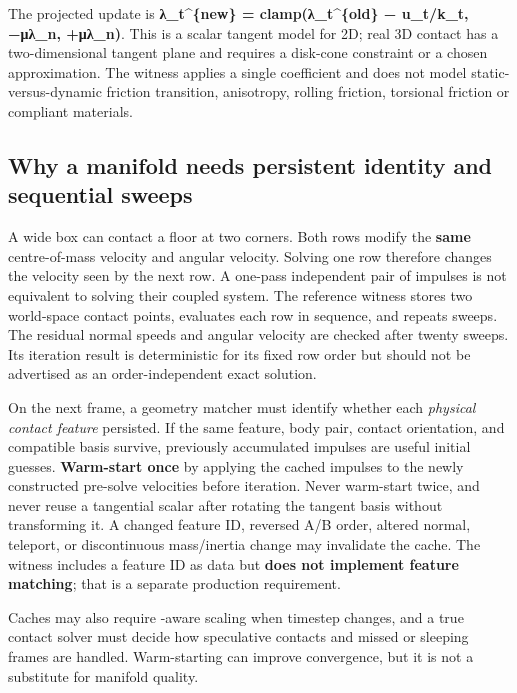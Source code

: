 The projected update is \textbf{λ\_t\^{}\{new\} = clamp(λ\_t\^{}\{old\} − u\_t/k\_t, −μλ\_n, +μλ\_n)}. This is a scalar tangent model for 2D; real 3D contact has a two-dimensional tangent plane and requires a disk-cone constraint or a chosen approximation. The witness applies a single coefficient and does not model static-versus-dynamic friction transition, anisotropy, rolling friction, torsional friction or compliant materials.

\subsection{Why a manifold needs persistent identity and sequential sweeps}\label{appendix-c9d92e145503-why-a-manifold-needs-persistent-identity-and-sequential-sweeps}

\hypertarget{appendix-c9d92e145503-why-a-manifold-needs-persistent-identity-and-sequential-sweeps}{}

A wide box can contact a floor at two corners. Both rows modify the \textbf{same} centre-of-mass velocity and angular velocity. Solving one row therefore changes the velocity seen by the next row. A one-pass independent pair of impulses is not equivalent to solving their coupled system. The reference witness stores two world-space contact points, evaluates each row in sequence, and repeats sweeps. The residual normal speeds and angular velocity are checked after twenty sweeps. Its iteration result is deterministic for its fixed row order but should not be advertised as an order-independent exact solution.

On the next frame, a geometry matcher must identify whether each \emph{physical contact feature} persisted. If the same feature, body pair, contact orientation, and compatible basis survive, previously accumulated impulses are useful initial guesses. \textbf{Warm-start once} by applying the cached impulses to the newly constructed pre-solve velocities before iteration. Never warm-start twice, and never reuse a tangential scalar after rotating the tangent basis without transforming it. A changed feature ID, reversed A/B order, altered normal, teleport, or discontinuous mass/inertia change may invalidate the cache. The witness includes a feature ID as data but \textbf{does not implement feature matching}; that is a separate production requirement.

Caches may also require -aware scaling when timestep changes, and a true contact solver must decide how speculative contacts and missed or sleeping frames are handled. Warm-starting can improve convergence, but it is not a substitute for manifold quality.

